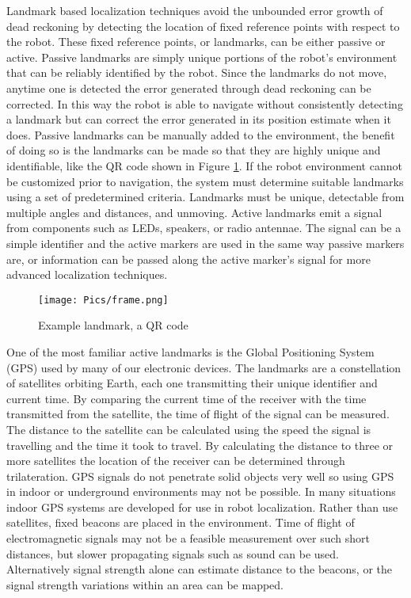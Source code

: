 Landmark based localization techniques avoid the unbounded error growth of dead reckoning by detecting the location of fixed reference points with respect to the robot. These fixed reference points, or landmarks, can be either passive or active. Passive landmarks are simply unique portions of the robot's environment that can be reliably identified by the robot. Since the landmarks do not move, anytime one is detected the error generated through dead reckoning can be corrected. In this way the robot is able to navigate without consistently detecting a landmark but can correct the error generated in its position estimate when it does. Passive landmarks can be manually added to the environment, the benefit of doing so is the landmarks can be made so that they are highly unique and identifiable, like the QR code shown in Figure \ref{fig:qr}. If the robot environment cannot be customized prior to navigation, the system must determine suitable landmarks using a set of predetermined criteria. Landmarks must be unique, detectable from multiple angles and distances, and unmoving. Active landmarks emit a signal from components such as LEDs, speakers, or radio antennae. The signal can be a simple identifier and the active markers are used in the same way passive markers are, or information can be passed along the active marker's signal for more advanced localization techniques.\\

\begin{figure}
    \centering
    \texttt{[image: Pics/frame.png]}
    \caption{Example landmark, a QR code}
    \label{fig:qr}
\end{figure}

One of the most familiar active landmarks is the Global Positioning System (GPS) used by many of our electronic devices. The landmarks are a constellation of satellites orbiting Earth, each one transmitting their unique identifier and current time. By comparing the current time of the receiver with the time transmitted from the satellite, the time of flight of the signal can be measured. The distance to the satellite can be calculated using the speed the signal is travelling and the time it took to travel. By calculating the distance to three or more satellites the location of the receiver can be determined through trilateration. GPS signals do not penetrate solid objects very well so using GPS in indoor or underground environments may not be possible. In many situations indoor GPS systems are developed for use in robot localization. Rather than use satellites, fixed beacons are placed in the environment. Time of flight of electromagnetic signals may not be a feasible measurement over such short distances, but slower propagating signals such as sound can be used. Alternatively signal strength alone can estimate distance to the beacons, or the signal strength variations within an area can be mapped.\\


